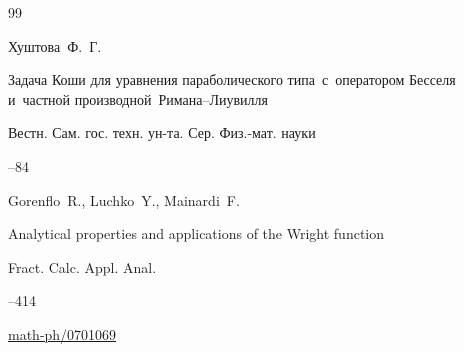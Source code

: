 \begin{thebibliography}{99}

\by Хуштова~Ф.~Г.

\paper Задача Коши для уравнения параболического типа~с~оператором Бесселя и~частной производной~Римана--Лиувилля

\jour Вестн. Сам. гос. техн. ун-та. Сер. Физ.-мат. науки




--84


















\by Gorenflo~R., Luchko~Y., Mainardi~F.

\paper Analytical properties and applications of the Wright function

\jour Fract. Calc. Appl. Anal.




--414

\arxiv \href{https://arxiv.org/abs/math-ph/0701069}{math-ph/0701069}







\end{thebibliography}
